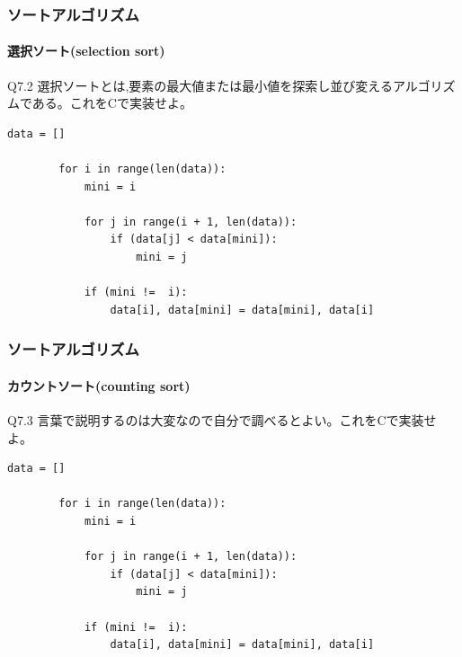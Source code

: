 \documentclass[dvipdfmx]{beamer}
\begin{document}
\begin{frame}[t, fragile]
    \frametitle{ソートアルゴリズム}
    \framesubtitle{選択ソート(selection sort)}
    \begin{itembox}[l]{Q7.2}
        選択ソートとは,要素の最大値または最小値を探索し並び変えるアルゴリズムである。これをCで実装せよ。
    \end{itembox}
    \begin{lstlisting}[gobble=8, caption=selectionSort.py, label=selectionSort]
        data = []

        for i in range(len(data)):
            mini = i

            for j in range(i + 1, len(data)):
                if (data[j] < data[mini]):
                    mini = j

            if (mini !=  i):
                data[i], data[mini] = data[mini], data[i]
    \end{lstlisting}
\end{frame}

\begin{frame}[t, fragile]
    \frametitle{ソートアルゴリズム}
    \framesubtitle{カウントソート(counting sort)}
    \begin{itembox}[l]{Q7.3}
        言葉で説明するのは大変なので自分で調べるとよい。これをCで実装せよ。
    \end{itembox}
    \begin{lstlisting}[gobble=8, caption=selectionSort.py, label=selectionSort]
        data = []

        for i in range(len(data)):
            mini = i

            for j in range(i + 1, len(data)):
                if (data[j] < data[mini]):
                    mini = j

            if (mini !=  i):
                data[i], data[mini] = data[mini], data[i]
    \end{lstlisting}
\end{frame}
\end{document}
